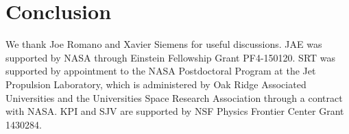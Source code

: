 \documentclass[twocolumn,aps,prd,superscriptaddress]{revtex4-1}
\begin{document}
\section{Conclusion}
\label{sec:conclusion}


\acknowledgments
We thank Joe Romano and Xavier Siemens for useful discussions. 
JAE was supported by NASA through Einstein Fellowship Grant PF4-150120. 
SRT was supported by appointment to the NASA Postdoctoral Program 
at the Jet Propulsion Laboratory, which is administered by Oak Ridge Associated Universities 
and the Universities Space Research Association through a contract with NASA. 
KPI and SJV are supported by NSF Physics Frontier Center Grant 1430284.




\end{document}
